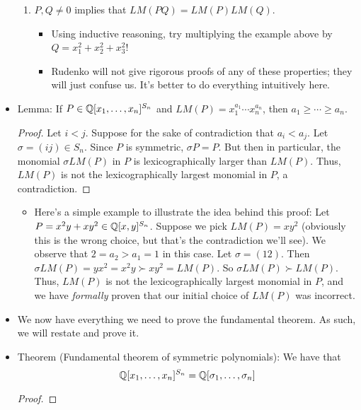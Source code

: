 \documentclass[../notes.tex]{subfiles}
\begin{document}
\begin{itemize}
\begin{enumerate}
        \item $P,Q\neq 0$ implies that $LM(PQ)=LM(P)LM(Q)$.
        \begin{itemize}
            \item Using inductive reasoning, try multiplying the example above by $Q=x_1^2+x_2^2+x_3^2$!
            \item Rudenko will not give rigorous proofs of any of these properties; they will just confuse us. It's better to do everything intuitively here.
        \end{itemize}
    \end{enumerate}
    \item Lemma: If $P\in\mathbb{Q}[x_1,\dots,x_n]^{S_n}$ and $LM(P)=x_1^{a_1}\cdots x_n^{a_n}$, then $a_1\geq\cdots\geq a_n$.
    \begin{proof}
        Let $i<j$. Suppose for the sake of contradiction that $a_i<a_j$. Let $\sigma=(ij)\in S_n$. Since $P$ is symmetric, $\sigma P=P$. But then in particular, the monomial $\sigma LM(P)$ in $P$ is lexicographically larger than $LM(P)$. Thus, $LM(P)$ is not the lexicographically largest monomial in $P$, a contradiction.
    \end{proof}
    \begin{itemize}
        \item Here's a simple example to illustrate the idea behind this proof: Let $P=x^2y+xy^2\in\mathbb{Q}[x,y]^{S_n}$. Suppose we pick $LM(P)=xy^2$ (obviously this is the wrong choice, but that's the contradiction we'll see). We observe that $2=a_2>a_1=1$ in this case. Let $\sigma=(12)$. Then $\sigma LM(P)=yx^2=x^2y\succ xy^2=LM(P)$. So $\sigma LM(P)\succ LM(P)$. Thus, $LM(P)$ is not the lexicographically largest monomial in $P$, and we have \emph{formally} proven that our initial choice of $LM(P)$ was incorrect.
    \end{itemize}
    \item We now have everything we need to prove the fundamental theorem. As such, we will restate and prove it.
    \item Theorem (Fundamental theorem of symmetric polynomials): We have that
    \begin{equation*}
        \mathbb{Q}[x_1,\dots,x_n]^{S_n} = \mathbb{Q}[\sigma_1,\dots,\sigma_n]
    \end{equation*}
    \begin{proof}

\end{proof}
\end{itemize}
\end{document}

